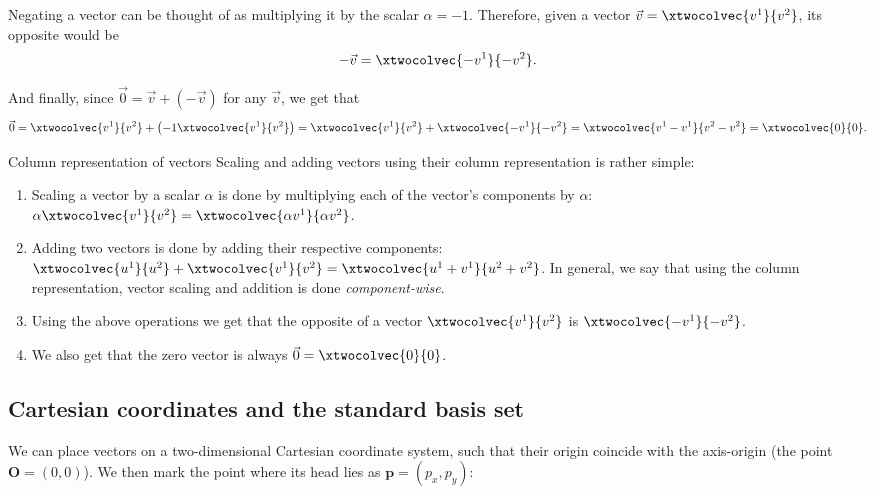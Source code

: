 Negating a vector can be thought of as multiplying it by the scalar $\alpha=-1$. Therefore, given a vector $\vec{v}=\xtwocolvec{v^{1}}{v^{2}}$, its opposite would be
\begin{equation}
  -\vec{v}=\xtwocolvec{-v^{1}}{-v^{2}}.
  \label{eq:column_representation_opposite}
\end{equation}

And finally, since $\vec{0}=\vec{v}+\left(-\vec{v}\right)$ for any $\vec{v}$, we get that
\begin{equation}
  \vec{0} = \xtwocolvec{v^{1}}{v^{2}}+\left(-1\xtwocolvec{v^{1}}{v^{2}}\right) = \xtwocolvec{v^{1}}{v^{2}}+\xtwocolvec{-v^{1}}{-v^{2}} = \xtwocolvec{v^{1}-v^{1}}{v^{2}-v^{2}} = \xtwocolvec{0}{0}.
  \label{eq:column_representation_zero_vec}
\end{equation}

\begin{summary}{Column representation of vectors}{}
  Scaling and adding vectors using their column representation is rather simple:
  \begin{enumerate}
    \item Scaling a vector by a scalar $\alpha$ is done by multiplying each of the vector's components by $\alpha$: $\alpha\xtwocolvec{v^{1}}{v^{2}}=\xtwocolvec{\alpha v^{1}}{\alpha v^{2}}$.
    \item Adding two vectors is done by adding their respective components: $\xtwocolvec{u^{1}}{u^{2}}+\xtwocolvec{v^{1}}{v^{2}}=\xtwocolvec{u^{1}+v^{1}}{u^{2}+v^{2}}$.
    In general, we say that using the column representation, vector scaling and addition is done \emph{component-wise}.
    \item Using the above operations we get that the opposite of a vector $\xtwocolvec{v^{1}}{v^{2}}$ is $\xtwocolvec{-v^{1}}{-v^{2}}$.
    \item We also get that the zero vector is always $\vec{0}=\xtwocolvec{0}{0}$.

  \end{enumerate}
\end{summary}

\subsection{Cartesian coordinates and the standard basis set}
We can place vectors on a two-dimensional Cartesian coordinate system, such that their origin coincide with the axis-origin (the point $\bm{O}=(0,0)$). We then mark the point where its head lies as $\bm{p}=(p_{x},p_{y})$:


